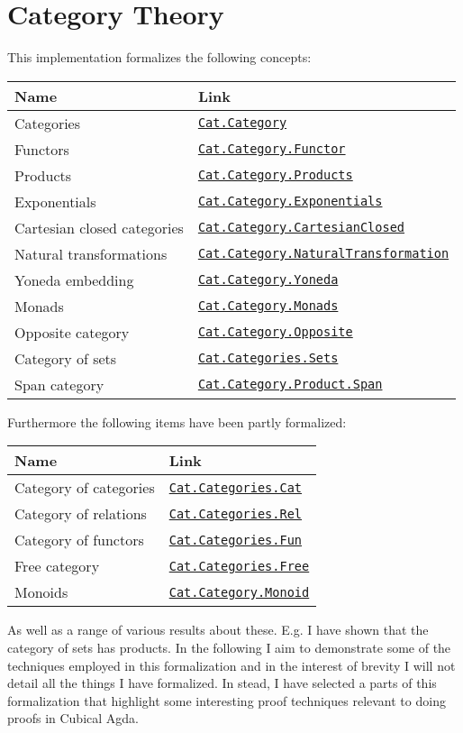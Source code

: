 \chapter{Category Theory}
\label{ch:implementation}
This implementation formalizes the following concepts:
%
\newcommand{\sourcebasepath}{http://web.student.chalmers.se/~hanghj/cat/doc/html/}
\newcommand{\sourcelink}[1]{\href{\sourcebasepath#1.html}{\texttt{#1}}}
\begin{center}
\begin{tabular}{ l l }
Name & Link \\
\hline
Categories & \sourcelink{Cat.Category} \\
Functors & \sourcelink{Cat.Category.Functor} \\
Products & \sourcelink{Cat.Category.Products} \\
Exponentials & \sourcelink{Cat.Category.Exponentials} \\
Cartesian closed categories & \sourcelink{Cat.Category.CartesianClosed} \\
Natural transformations & \sourcelink{Cat.Category.NaturalTransformation} \\
Yoneda embedding & \sourcelink{Cat.Category.Yoneda} \\
Monads & \sourcelink{Cat.Category.Monads} \\
Opposite category &
\href{\sourcebasepath Cat.Category.html#22744}{\texttt{Cat.Category.Opposite}} \\
Category of sets & \sourcelink{Cat.Categories.Sets} \\
Span category &
\href{\sourcebasepath Cat.Category.Product.html#2919}{\texttt{Cat.Category.Product.Span}} \\
\end{tabular}
\end{center}
%
Furthermore the following items have been partly formalized:
%
\begin{center}
\begin{tabular}{ l l }
Name & Link \\
\hline
Category of categories & \sourcelink{Cat.Categories.Cat} \\
Category of relations & \sourcelink{Cat.Categories.Rel} \\
Category of functors & \sourcelink{Cat.Categories.Fun} \\
Free category & \sourcelink{Cat.Categories.Free} \\
Monoids & \sourcelink{Cat.Category.Monoid} \\
\end{tabular}
\end{center}
%
As well as a range of various results about these. E.g. I have shown that the
category of sets has products. In the following I aim to demonstrate some of the
techniques employed in this formalization and in the interest of brevity I will
not detail all the things I have formalized. In stead, I have selected a parts
of this formalization that highlight some interesting proof techniques relevant
to doing proofs in Cubical Agda.

